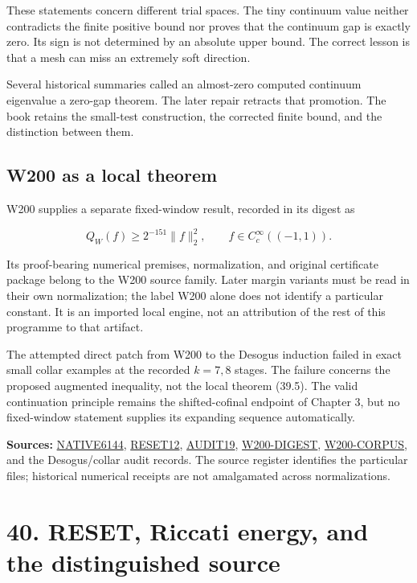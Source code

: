 \documentclass[
  10pt,
  a4paper,
  10pt,
  oneside,
  openany]{book}
\begin{document}
These statements concern different trial spaces. The tiny continuum
value neither contradicts the finite positive bound nor proves that the
continuum gap is exactly zero. Its sign is not determined by an absolute
upper bound. The correct lesson is that a mesh can miss an extremely
soft direction.

Several historical summaries called an almost-zero computed continuum
eigenvalue a zero-gap theorem. The later repair retracts that promotion.
The book retains the small-test construction, the corrected finite
bound, and the distinction between them.

\subsection{W200 as a local theorem}\label{w200-as-a-local-theorem}

W200 supplies a separate fixed-window result, recorded in its digest as

\[
 Q_W(f)\ge2^{-151}\|f\|_2^2,
 \qquad f\in C_c^\infty((-1,1)).
 \tag{39.5}\label{eq:39.5}
\]

Its proof-bearing numerical premises, normalization, and original
certificate package belong to the W200 source family. Later margin
variants must be read in their own normalization; the label W200 alone
does not identify a particular constant. It is an imported local engine,
not an attribution of the rest of this programme to that artifact.

The attempted direct patch from W200 to the Desogus induction failed in
exact small collar examples at the recorded \(k=7,8\) stages. The
failure concerns the proposed augmented inequality, not the local
theorem (39.5). The valid continuation principle remains the
shifted-cofinal endpoint of Chapter 3, but no fixed-window statement
supplies its expanding sequence automatically.

\textbf{Sources:} \hyperref[source-native6144]{NATIVE6144},
\hyperref[source-reset12]{RESET12}, \hyperref[source-audit19]{AUDIT19},
\hyperref[source-w200-digest]{W200-DIGEST},
\hyperref[source-w200-corpus]{W200-CORPUS}, and the Desogus/collar audit
records. The source register identifies the particular files; historical
numerical receipts are not amalgamated across normalizations.

\section{40. RESET, Riccati energy, and the distinguished
source}\label{ch-reset-energy}
\end{document}
